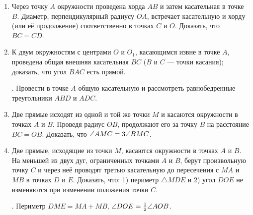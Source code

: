 \begin{enumerate}[resume]
\item
Через точку $A$ окружности проведена хорда $AB$ и затем касательная в точке $B$.
Диаметр, перпендикулярный радиусу $OA$, встречает касательную и хорду (или её продолжение) соответственно в точках $C$ и $O$.
Доказать, что $BC=CD$.

\item
К двум окружностям с центрами $O$ и $O_1$, касающимся извне в точке $A$, проведена общая внешняя касательная $BC$ ($B$ и $C$ — точки касания);
доказать, что угол $BAC$ есть прямой.

\smallskip
{}.
Провести в точке $A$ общую касательную и рассмотреть равнобедренные треугольники $ABD$ и $ADC$.

\item
Две прямые исходят из одной и той же точки $M$ и касаются окружности в точках $A$ и $B$.
Проведя радиус $OB$, продолжают его за точку $B$ на расстояние $BC=OB$.
Доказать, что $\angle AMC\z=3\angle BMC$.

\item
Две прямые, исходящие из точки $M$, касаются окружности в точках $A$ и $B$.
На меньшей из двух дуг, ограниченных точками $A$ и $B$, берут произвольную точку $C$ и через неё проводят третью касательную до пересечения с $MA$ и $MB$ в точках $D$ и $E$.
Доказать, что:
1) периметр $\triangle MDE$ и 2) угол $DOE$ не изменяются при изменении положения точки $C$.

\smallskip
{}.
Периметр $DME=MA+MB$, $\angle DOE\z=\tfrac12 \angle AOB$.
\end{enumerate}


\begin{center}
\end{center}

